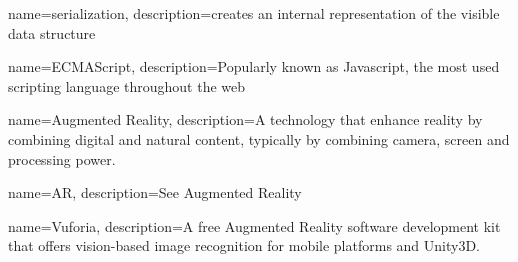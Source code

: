 {
	name=serialization,
	description={creates an internal representation of the visible data 
  				structure}
}

{
	name=ECMAScript,
	description={Popularly known as Javascript, the most used scripting
				language throughout the web}
}

{
	name=Augmented Reality,
	description={A technology that enhance reality by combining digital and
				natural content, typically by combining camera, screen and
				processing power.}
}

{
	name=AR,
	description={See \gls{Augmented Reality}}
}

{
	name=Vuforia,
	description={A free Augmented Reality software development kit that	offers
				vision-based image recognition for mobile platforms	and 
				Unity3D.}
}
